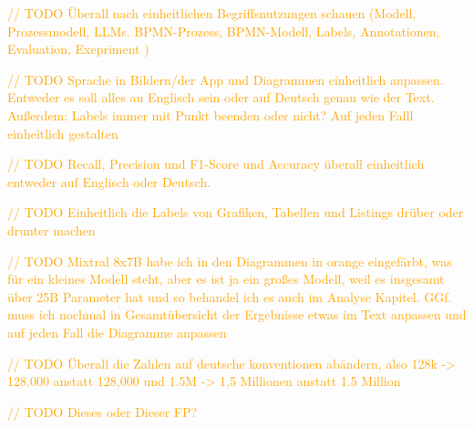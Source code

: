 \textcolor{orange}{// TODO Überall nach einheitlichen Begriffsnutzungen schauen (Modell, Prozessmodell, LLMs. BPMN-Prozess, BPMN-Modell, Labels, Annotationen, Evaluation, Exepriment )}

\textcolor{orange}{// TODO Sprache in Bildern/der App und Diagrammen einheitlich anpassen. Entweder es soll alles au Englisch sein oder auf Deutsch genau wie der Text. Außerdem: Labels immer mit Punkt beenden oder nicht? Auf jeden Falll einheitlich gestalten}

\textcolor{orange}{// TODO Recall, Precision und F1-Score und Accuracy überall einheitlich entweder auf Englisch oder Deutsch.}

\textcolor{orange}{// TODO Einheitlich die Labels von Grafiken, Tabellen und Listings drüber oder drunter machen}

\textcolor{orange}{// TODO Mixtral 8x7B habe ich in den Diagrammen in orange eingefärbt, was für ein kleines Modell steht, aber es ist ja ein großes Modell, weil es insgesamt über 25B Parameter hat und so behandel ich es auch im Analyse Kapitel. GGf. muss ich nochmal in Gesamtübersicht der Ergebnisse etwas im Text anpassen und auf jeden Fall die Diagramme anpassen}

\textcolor{orange}{// TODO Überall die Zahlen auf deutsche konventionen abändern, also 128k -> 128.000 anstatt 128,000 und 1.5M -> 1,5 Millionen anstatt 1.5 Million}

\textcolor{orange}{// TODO Dieses oder Dieser FP?}












